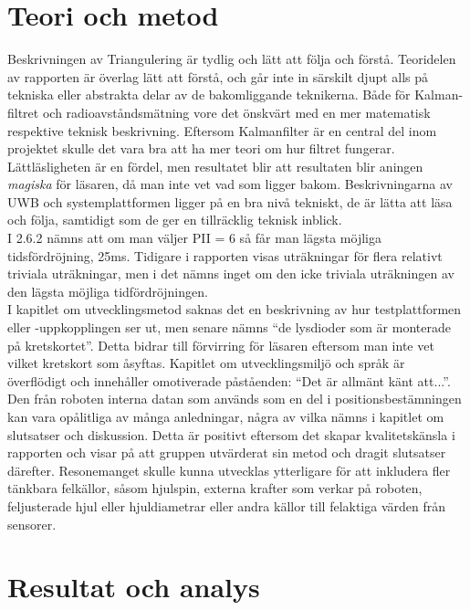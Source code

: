 \documentclass[a4paper,11pt]{article}
\begin{document}
\section{Teori och metod}

Beskrivningen av Triangulering är tydlig och lätt att följa och förstå. Teoridelen av rapporten är överlag lätt att förstå, och går inte in särskilt djupt alls på tekniska eller abstrakta delar av de bakomliggande teknikerna. Både för Kalman-filtret och radioavståndsmätning vore det önskvärt med en mer matematisk respektive teknisk beskrivning. Eftersom Kalmanfilter är en central del inom projektet skulle det vara bra att ha mer teori om hur filtret fungerar. Lättläsligheten är en fördel, men resultatet blir att resultaten blir aningen \emph{magiska} för läsaren, då man inte vet vad som ligger bakom. Beskrivningarna av UWB och systemplattformen ligger på en bra nivå tekniskt, de är lätta att läsa och följa, samtidigt som de ger en tillräcklig teknisk inblick. \\

I 2.6.2 nämns att om man väljer PII = 6 så får man lägsta möjliga tidsfördröjning, 25ms. Tidigare i rapporten visas uträkningar för flera relativt triviala uträkningar, men i det nämns inget om den icke triviala uträkningen av den lägsta möjliga tidfördröjningen. \\

I kapitlet om utvecklingsmetod saknas det en beskrivning av hur testplattformen eller -uppkopplingen ser ut, men senare nämns “de lysdioder som är monterade på kretskortet”. Detta bidrar till förvirring för läsaren eftersom man inte vet vilket kretskort som åsyftas. Kapitlet om utvecklingsmiljö och språk är överflödigt och innehåller omotiverade påståenden: “Det är allmänt känt att...”. \\

Den från roboten interna datan som används som en del i positionsbestämningen kan vara opålitliga av många anledningar, några av vilka nämns i kapitlet om slutsatser och diskussion. Detta är positivt eftersom det skapar kvalitetskänsla i rapporten och visar på att gruppen utvärderat sin metod och dragit slutsatser därefter. Resonemanget skulle kunna utvecklas ytterligare för att inkludera fler tänkbara felkällor, såsom hjulspin, externa krafter som verkar på roboten, feljusterade hjul eller hjuldiametrar eller andra källor till felaktiga värden från sensorer. \\

\section{Resultat och analys}
\end{document}
